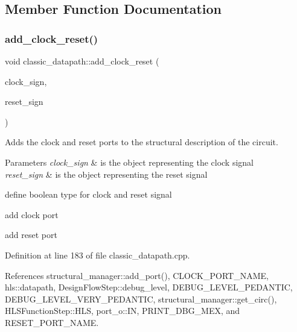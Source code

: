 \subsection{Member Function Documentation}
\mbox{\label{classclassic__datapath_ae85a2f537298fac7a7f458b491ea94a5}} 
\subsubsection{\texorpdfstring{add\+\_\+clock\+\_\+reset()}{add\_clock\_reset()}}
{\footnotesize\ttfamily void classic\+\_\+datapath\+::add\+\_\+clock\+\_\+reset (\begin{DoxyParamCaption}\item[{\hyperlink{structural__objects_8hpp_a8ea5f8cc50ab8f4c31e2751074ff60b2}{structural\+\_\+object\+Ref} \&}]{clock\+\_\+sign,  }\item[{\hyperlink{structural__objects_8hpp_a8ea5f8cc50ab8f4c31e2751074ff60b2}{structural\+\_\+object\+Ref} \&}]{reset\+\_\+sign }\end{DoxyParamCaption})\hspace{0.3cm}{\ttfamily [protected]}}



Adds the clock and reset ports to the structural description of the circuit. 


\begin{DoxyParams}{Parameters}
{\em clock\+\_\+sign} & is the object representing the clock signal \\
\hline
{\em reset\+\_\+sign} & is the object representing the reset signal \\
\hline
\end{DoxyParams}
define boolean type for clock and reset signal

add clock port

add reset port 

Definition at line 183 of file classic\+\_\+datapath.\+cpp.



References structural\+\_\+manager\+::add\+\_\+port(), C\+L\+O\+C\+K\+\_\+\+P\+O\+R\+T\+\_\+\+N\+A\+ME, hls\+::datapath, Design\+Flow\+Step\+::debug\+\_\+level, D\+E\+B\+U\+G\+\_\+\+L\+E\+V\+E\+L\+\_\+\+P\+E\+D\+A\+N\+T\+IC, D\+E\+B\+U\+G\+\_\+\+L\+E\+V\+E\+L\+\_\+\+V\+E\+R\+Y\+\_\+\+P\+E\+D\+A\+N\+T\+IC, structural\+\_\+manager\+::get\+\_\+circ(), H\+L\+S\+Function\+Step\+::\+H\+LS, port\+\_\+o\+::\+IN, P\+R\+I\+N\+T\+\_\+\+D\+B\+G\+\_\+\+M\+EX, and R\+E\+S\+E\+T\+\_\+\+P\+O\+R\+T\+\_\+\+N\+A\+ME.



